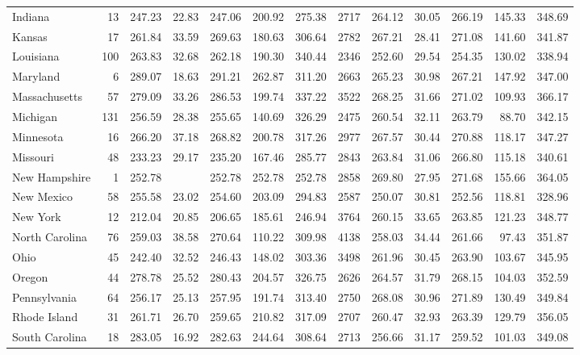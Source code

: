 \begin{sidewaystable}[htb]
\begin{center}
{\begin{tabular}{lrrrrrr@{\extracolsep{10pt}}rrrrrr}
  Indiana &  13 & 247.23 & 22.83 & 247.06 & 200.92 & 275.38 & 2717 & 264.12 & 30.05 & 266.19 & 145.33 & 348.69 \\ 
  Kansas &  17 & 261.84 & 33.59 & 269.63 & 180.63 & 306.64 & 2782 & 267.21 & 28.41 & 271.08 & 141.60 & 341.87 \\ 
  Louisiana & 100 & 263.83 & 32.68 & 262.18 & 190.30 & 340.44 & 2346 & 252.60 & 29.54 & 254.35 & 130.02 & 338.94 \\ 
  Maryland &   6 & 289.07 & 18.63 & 291.21 & 262.87 & 311.20 & 2663 & 265.23 & 30.98 & 267.21 & 147.92 & 347.00 \\ 
  Massachusetts &  57 & 279.09 & 33.26 & 286.53 & 199.74 & 337.22 & 3522 & 268.25 & 31.66 & 271.02 & 109.93 & 366.17 \\ 
  Michigan & 131 & 256.59 & 28.38 & 255.65 & 140.69 & 326.29 & 2475 & 260.54 & 32.11 & 263.79 & 88.70 & 342.15 \\ 
  Minnesota &  16 & 266.20 & 37.18 & 268.82 & 200.78 & 317.26 & 2977 & 267.57 & 30.44 & 270.88 & 118.17 & 347.27 \\ 
  Missouri &  48 & 233.23 & 29.17 & 235.20 & 167.46 & 285.77 & 2843 & 263.84 & 31.06 & 266.80 & 115.18 & 340.61 \\ 
  New Hampshire &   1 & 252.78 &  & 252.78 & 252.78 & 252.78 & 2858 & 269.80 & 27.95 & 271.68 & 155.66 & 364.05 \\ 
  New Mexico &  58 & 255.58 & 23.02 & 254.60 & 203.09 & 294.83 & 2587 & 250.07 & 30.81 & 252.56 & 118.81 & 328.96 \\ 
  New York &  12 & 212.04 & 20.85 & 206.65 & 185.61 & 246.94 & 3764 & 260.15 & 33.65 & 263.85 & 121.23 & 348.77 \\ 
  North Carolina &  76 & 259.03 & 38.58 & 270.64 & 110.22 & 309.98 & 4138 & 258.03 & 34.44 & 261.66 & 97.43 & 351.87 \\ 
  Ohio &  45 & 242.40 & 32.52 & 246.43 & 148.02 & 303.36 & 3498 & 261.96 & 30.45 & 263.90 & 103.67 & 345.95 \\ 
  Oregon &  44 & 278.78 & 25.52 & 280.43 & 204.57 & 326.75 & 2626 & 264.57 & 31.79 & 268.15 & 104.03 & 352.59 \\ 
  Pennsylvania &  64 & 256.17 & 25.13 & 257.95 & 191.74 & 313.40 & 2750 & 268.08 & 30.96 & 271.89 & 130.49 & 349.84 \\ 
  Rhode Island &  31 & 261.71 & 26.70 & 259.65 & 210.82 & 317.09 & 2707 & 260.47 & 32.93 & 263.39 & 129.79 & 356.05 \\ 
  South Carolina &  18 & 283.05 & 16.92 & 282.63 & 244.64 & 308.64 & 2713 & 256.66 & 31.17 & 259.52 & 101.03 & 349.08 \\ 

\end{tabular}}
\end{center}
\end{sidewaystable}
